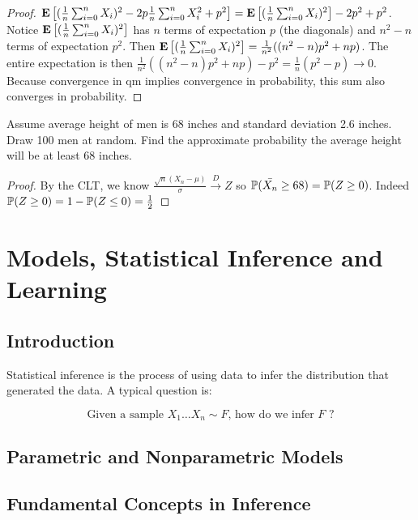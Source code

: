 \documentclass[10pt]{article}
\begin{document}
\begin{proof}
    $\E{(\frac{1}{n}\sum_{i=0}^nX_i)^2 - 2p\frac{1}{n}\sum_{i=0}^nX_i^2 + p^2}
    = \E{(\frac{1}{n}\sum_{i=0}^nX_i)^2} -2p^2 + p^2$. Notice
    $\E{(\frac{1}{n}\sum_{i=0}^nX_i)^2}$ has $n$ terms of expectation $p$ (the
    diagonals) and $n^2-n$ terms of expectation $p^2$. Then
    $\E{(\frac{1}{n}\sum_{i=0}^nX_i)^2} = \frac{1}{n^2}((n^2-n)p^2 + np)$. The
    entire expectation is then $\frac{1}{n^2}((n^2-n)p^2 + np) - p^2 =
    \frac{1}{n}(p^2-p) \xrightarrow{} 0$.
    Because convergence in qm implies convergence in probability, this sum also
    converges in probability.
\end{proof}

\begin{exercise}
    Assume average height of men is 68 inches and standard deviation 2.6 inches.
    Draw 100 men at random. Find the approximate probability the average height will be at
    least 68 inches.
\end{exercise}

\begin{proof}
    By the CLT, we know $\frac{\sqrt{n}(X_n-\mu)}{\sigma} \xrightarrow{D} Z$ so $\P(\bar{X_n} \geq 68) = \P(Z \geq 0)$. Indeed $\P(Z \geq 0) = 1 - \P(Z \leq 0) = \frac{1}{2}$
\end{proof}

\section{Models, Statistical Inference and Learning}

\subsection{Introduction}

Statistical inference is the process of using data to infer the distribution
that generated the data. A typical question is:

\[ \text{Given a sample }X_1 \dots X_n \sim F\text{, how do we infer }F\text{ ?} \]

\subsection{Parametric and Nonparametric Models}

\subsection{Fundamental Concepts in Inference}
\end{document}
